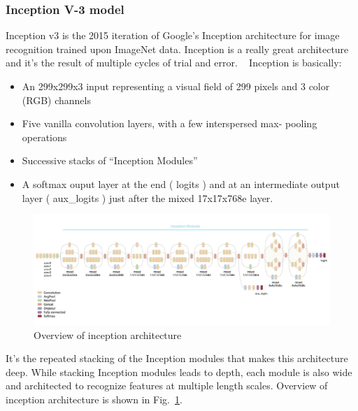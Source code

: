 \subsubsection{Inception V-3 model}
Inception v3 is the 2015 iteration of Google’s Inception architecture for image recognition trained upon ImageNet data. Inception is a really great architecture and it’s the result of multiple cycles of trial and error.
 
Inception is basically:
\begin{itemize}
	\item An 299x299x3 input representing a visual field of 299 pixels
	and 3 color (RGB) channels
	\item Five vanilla convolution layers, with a few interspersed max-
	pooling operations
	\item Successive stacks of ``Inception Modules''
	\item A softmax ouput layer at the end ( logits ) and at an intermediate 	output layer ( aux\_logits ) just after the mixed 17x17x768e layer.
\end{itemize}


\begin{figure}[h]
	\includegraphics[width=1\linewidth]{fin_img_14}
	\centering
	\caption{\label{fig: inception}Overview of inception architecture~\cite{arxivorg71:online}}
\end{figure}




It’s the repeated stacking of the Inception modules that makes this architecture deep. While stacking Inception modules leads to depth, each module is also wide and architected to recognize features at multiple length scales. Overview of inception architecture is shown in Fig.~\ref{fig: inception}.











